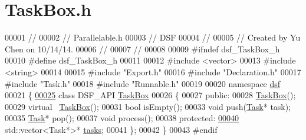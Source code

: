 \hypertarget{_task_box_8h_source}{}\section{Task\+Box.\+h}
\label{_task_box_8h_source}

\begin{DoxyCode}
00001 \textcolor{comment}{//}
00002 \textcolor{comment}{//  Parallelable.h}
00003 \textcolor{comment}{//  DSF}
00004 \textcolor{comment}{//}
00005 \textcolor{comment}{//  Created by Yu Chen on 10/14/14.}
00006 \textcolor{comment}{//}
00007 \textcolor{comment}{//}
00008 
00009 \textcolor{preprocessor}{#ifndef dsf\_TaskBox\_h}
00010 \textcolor{preprocessor}{#define dsf\_TaskBox\_h}
00011 
00012 \textcolor{preprocessor}{#include <vector>}
00013 \textcolor{preprocessor}{#include <string>}
00014 
00015 \textcolor{preprocessor}{#include "Export.h"}
00016 \textcolor{preprocessor}{#include "Declaration.h"}
00017 \textcolor{preprocessor}{#include "Task.h"}
00018 \textcolor{preprocessor}{#include "Runnable.h"}
00019 
00020 \textcolor{keyword}{namespace }\hyperlink{namespacedsf}{dsf}
00021 \{
\hypertarget{_task_box_8h_source_l00025}{}\hyperlink{classdsf_1_1_task_box}{00025}     \textcolor{keyword}{class }DSF\_API \hyperlink{classdsf_1_1_task_box}{TaskBox}
00026     \{
00027     \textcolor{keyword}{public}:
00028         \hyperlink{namespacedsf_ac3c92e2a98380dd728b0c18d0c495966}{TaskBox}();
00029         \textcolor{keyword}{virtual} ~\hyperlink{classdsf_1_1_task_box}{TaskBox}();
00031         \textcolor{keywordtype}{bool} isEmpty();
00033         \textcolor{keywordtype}{void} push(\hyperlink{classdsf_1_1_task}{Task}* task);
00035         \hyperlink{classdsf_1_1_task}{Task}* pop();
00037         \textcolor{keywordtype}{void} process();
00038     \textcolor{keyword}{protected}:
\hypertarget{_task_box_8h_source_l00040}{}\hyperlink{classdsf_1_1_task_box_ae13d0d245cacbf7f4019f7ff5486aa79}{00040}         std::vector<Task*>* \hyperlink{classdsf_1_1_task_box_ae13d0d245cacbf7f4019f7ff5486aa79}{tasks};
00041     \};
00042 \}
00043 \textcolor{preprocessor}{#endif}
\end{DoxyCode}
